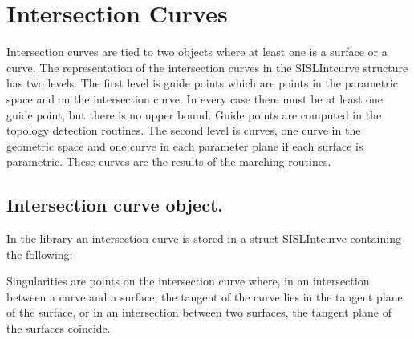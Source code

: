 \section{Intersection Curves}
Intersection curves are tied to two objects where at
least one is a surface or a curve.
The representation of the intersection curves in the SISLIntcurve structure has two levels.
The first level is guide points which are
points in the parametric space and on the intersection
curve. In every case
there must be at least one guide point, but there is no
upper bound. Guide points are computed in the topology detection routines.
The second level is curves,
one curve in the geometric space and one curve in each
parameter plane if each surface is parametric. These curves are the results of the marching routines.

\subsection{Intersection curve object.}

In the library an intersection curve is stored in a struct SISLIntcurve
containing the following:

Singularities are points on the intersection curve where, in an intersection between a curve and a surface, the tangent
of the curve lies in the tangent plane of the surface, or in an intersection between two surfaces, the tangent plane
of the surfaces coincide.
\pgsbreak

\pgsbreak

\pgsbreak

